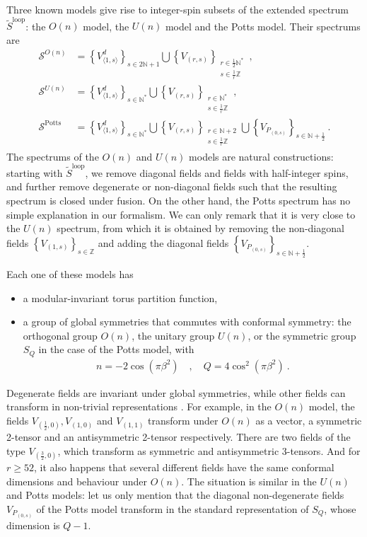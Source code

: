 \documentclass[12pt, a4paper]{article}
\theoremstyle{break}
\begin{document}
Three known models give rise to integer-spin subsets of the extended spectrum $\widetilde{S}^\text{loop}$: the $O(n)$ model, the $U(n)$ model and the Potts model. 
Their spectrums are 
\begin{align}
\mathcal{S}^{O(n)} &= \left\{V^d_{\langle 1,s\rangle}\right\}_{s\in 2\mathbb{N}+1} \bigcup \left\{V_{(r,s)}\right\}_{\substack{r\in \frac12\mathbb{N}^*\\ s\in\frac{1}{r}\mathbb{Z}}}  \ ,
 \\
 \mathcal{S}^{U(n)} &= \left\{V^d_{\langle 1,s\rangle}\right\}_{s\in\mathbb{N}^*} \bigcup \left\{V_{(r,s)}\right\}_{\substack{r\in \mathbb{N}^*\\ s\in\frac{1}{r}\mathbb{Z}}}  \ ,
 \\
 \mathcal{S}^\text{Potts} &= \left\{V^d_{\langle 1,s\rangle}\right\}_{s\in\mathbb{N}^*} \bigcup \left\{V_{(r,s)}\right\}_{\substack{r\in \mathbb{N}+2\\ s\in\frac{1}{r}\mathbb{Z}}} \bigcup  \left\{ V_{P_{(0,s)}}\right\}_{s\in \mathbb{N}+\frac12}\ .
\end{align}
The spectrums of the $O(n)$ and $U(n)$ models are natural constructions: starting with $\widetilde{S}^\text{loop}$, we remove diagonal fields and fields with half-integer spins, and further remove degenerate or non-diagonal fields such that the resulting spectrum is closed under fusion. On the other hand, the Potts spectrum has no simple explanation in our formalism. We can only remark that it is very close to the $U(n)$ spectrum, from which it is obtained by removing the non-diagonal fields $\left\{V_{(1,s)}\right\}_{s\in\mathbb{Z}}$ and adding the diagonal fields $\left\{ V_{P_{(0,s)}}\right\}_{s\in \mathbb{N}+\frac12}$. 

Each one of these models has
\begin{itemize}
 \item a modular-invariant torus partition function,
 \item a group of global symmetries that commutes with conformal symmetry: the orthogonal group $O(n)$, the unitary group $U(n)$, or the symmetric group $S_Q$ in the case of the Potts model, with 
 \begin{align}
  n = -2\cos\left(\pi \beta^2\right) \quad , \quad Q = 4\cos^2\left(\pi \beta^2\right)\ .
 \end{align}
\end{itemize}
Degenerate fields are invariant under global symmetries, while other fields can transform in non-trivial representations \cite{jrs22}. For example, in the $O(n)$ model, the fields $V_{(\frac12,0)},V_{(1,0)}$ and $V_{(1,1)}$ transform under $O(n)$ as a vector, a symmetric 2-tensor and an antisymmetric 2-tensor respectively. There are two fields of the type $V_{(\frac32,0)}$, which transform as symmetric and antisymmetric 3-tensors. And for $r\geq 52$, it also happens that several different fields have the same conformal dimensions and behaviour under $O(n)$. The situation is similar in the $U(n)$ and Potts models: let us only mention that the diagonal non-degenerate fields $V_{P_{(0,s)}}$ of the Potts model transform in the standard  representation of $S_Q$, whose dimension is $Q-1$. 
\end{document}

